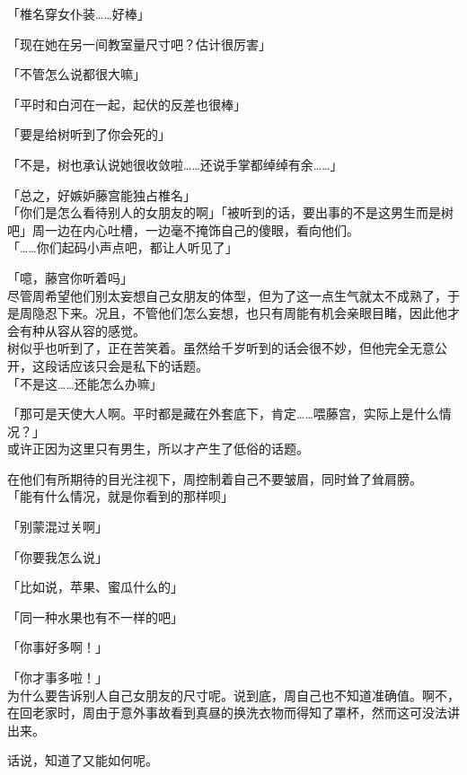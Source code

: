 「椎名穿女仆装……好棒」

「现在她在另一间教室量尺寸吧？估计很厉害」

「不管怎么说都很大嘛」

「平时和白河在一起，起伏的反差也很棒」

「要是给树听到了你会死的」

「不是，树也承认说她很收敛啦……还说手掌都绰绰有余……」

「总之，好嫉妒藤宫能独占椎名」\\

「你们是怎么看待别人的女朋友的啊」「被听到的话，要出事的不是这男生而是树吧」周一边在内心吐槽，一边毫不掩饰自己的傻眼，看向他们。\\

「……你们起码小声点吧，都让人听见了」

「噫，藤宫你听着吗」\\

尽管周希望他们别太妄想自己女朋友的体型，但为了这一点生气就太不成熟了，于是周隐忍下来。况且，不管他们怎么妄想，也只有周能有机会亲眼目睹，因此他才会有种从容从容的感觉。\\

树似乎也听到了，正在苦笑着。虽然给千岁听到的话会很不妙，但他完全无意公开，这段话应该只会是私下的话题。\\

「不是这……还能怎么办嘛」

「那可是天使大人啊。平时都是藏在外套底下，肯定……喂藤宫，实际上是什么情况？」\\

或许正因为这里只有男生，所以才产生了低俗的话题。

在他们有所期待的目光注视下，周控制着自己不要皱眉，同时耸了耸肩膀。\\

「能有什么情况，就是你看到的那样呗」

「别蒙混过关啊」

「你要我怎么说」

「比如说，苹果、蜜瓜什么的」

「同一种水果也有不一样的吧」

「你事好多啊！」

「你才事多啦！」\\

为什么要告诉别人自己女朋友的尺寸呢。说到底，周自己也不知道准确值。啊不，在回老家时，周由于意外事故看到真昼的换洗衣物而得知了罩杯，然而这可没法讲出来。

话说，知道了又能如何呢。\\

